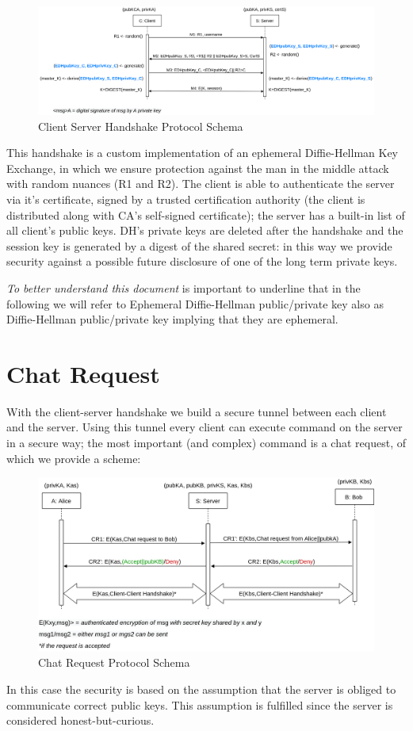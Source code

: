 \documentclass[11pt]{report}
\begin{document}
\begin{figure}[H]
	\centering
	\includegraphics[scale=0.18]{img/AuthClientServerVer2.png}
	\caption{Client Server Handshake Protocol Schema}
	\label {img: AuthClientServer}
\end{figure}

\noindent This handshake is a custom implementation of an ephemeral Diffie-Hellman Key Exchange, in which we ensure
protection against the man in the middle attack with random nuances (R1 and R2). The client is able to 
authenticate the server via it's certificate, signed by a trusted certification authority (the client
is distributed along with CA's self-signed certificate); the server has a built-in list of all client's
public keys. DH's private keys are deleted after the handshake and the session key is generated by a digest of the 
shared secret: in this way we provide security against a possible future disclosure of one of the long term private keys. 

\noindent \emph{To better understand this document} is important to underline that in the following we will refer to Ephemeral Diffie-Hellman public/private key also as Diffie-Hellman public/private key implying that they are ephemeral. 

\newpage
\section{Chat Request}
With the client-server handshake we build a secure tunnel between each client and the server. Using this 
tunnel every client can execute command on the server in a secure way; the most important (and complex) command
is a chat request, of which we provide a scheme:
\begin{figure}[H]
	\centering
	\includegraphics[scale=0.23]{img/ChatRequestVer2.png}
	\caption{Chat Request Protocol Schema}
	\label {img: ChatRequest}
\end{figure}
\noindent In this case the security is based on the assumption that the server is obliged to communicate correct public keys. This assumption is fulfilled since the server is considered honest-but-curious.
\end{document}
